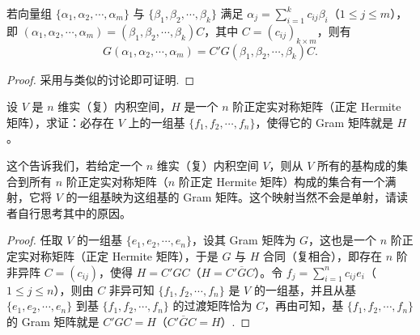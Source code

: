 \documentclass[../../main.tex]{subfiles}%
\begin{document}
\begin{corollary}\label{corollary:例9.3的推论}
若向量组 $\{\alpha_1,\alpha_2,\cdots,\alpha_m\}$ 与 $\{\beta_1,\beta_2,\cdots,\beta_k\}$ 满足 $\alpha_j = \sum_{i = 1}^{k}c_{ij}\beta_i$（$1\leqslant  j\leqslant  m$），即 $(\alpha_1,\alpha_2,\cdots,\alpha_m)=(\beta_1,\beta_2,\cdots,\beta_k)C$，其中 $C = (c_{ij})_{k\times m}$，则有
\[
G(\alpha_1,\alpha_2,\cdots,\alpha_m)=C'G(\beta_1,\beta_2,\cdots,\beta_k)C.
\]
\end{corollary}
\begin{proof}

采用与类似的讨论即可证明.

\end{proof}

\begin{proposition}\label{proposition:例9.4}
设 $V$ 是 $n$ 维实（复）内积空间，$H$ 是一个 $n$ 阶正定实对称矩阵（正定 Hermite 矩阵），求证：必存在 $V$ 上的一组基 $\{f_1,f_2,\cdots,f_n\}$，使得它的 Gram 矩阵就是 $H$。
\end{proposition}
\begin{remark}
这个告诉我们，若给定一个 $n$ 维实（复）内积空间 $V$，则从 $V$ 所有的基构成的集合到所有 $n$ 阶正定实对称矩阵（$n$ 阶正定 Hermite 矩阵）构成的集合有一个满射，它将 $V$ 的一组基映为这组基的 Gram 矩阵。这个映射当然不会是单射，请读者自行思考其中的原因。 
\end{remark}
\begin{proof}

任取 $V$ 的一组基 $\{e_1,e_2,\cdots,e_n\}$，设其 Gram 矩阵为 $G$，这也是一个 $n$ 阶正定实对称矩阵（正定 Hermite 矩阵），于是 $G$ 与 $H$ 合同（复相合），即存在 $n$ 阶非异阵 $C = (c_{ij})$，使得 $H = C'GC$（$H = C' \overline{G}C$）。令 $f_j = \sum_{i = 1}^{n}c_{ij}e_i$（$1 \leqslant  j \leqslant  n$），则由 $C$ 非异可知 $\{f_1,f_2,\cdots,f_n\}$ 是 $V$ 的一组基，并且从基 $\{e_1,e_2,\cdots,e_n\}$ 到基 $\{f_1,f_2,\cdots,f_n\}$ 的过渡矩阵恰为 $C$，再由可知，基 $\{f_1,f_2,\cdots,f_n\}$ 的 Gram 矩阵就是 $C'GC = H$（$C' \overline{G}C = H$）.

\end{proof}
\end{document}

